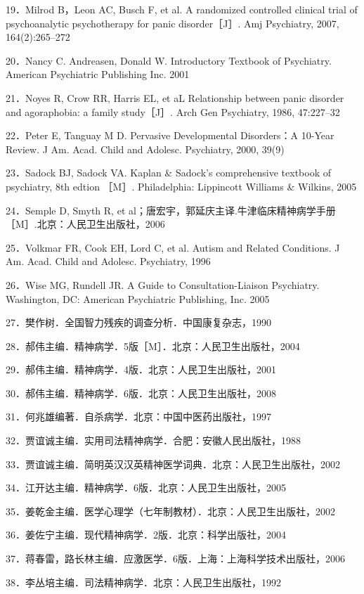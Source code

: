 19．Milrod B，Leon AC, Busch F, et al. A randomized controlled clinical
trial of psychoanalytic psychotherapy for panic disorder［J］. Amj
Psychiatry, 2007, 164(2):265--272

20．Nancy C. Andreasen, Donald W. Introductory Textbook of Psychiatry.
American Psychiatric Publishing Inc. 2001

21．Noyes R, Crow RR, Harris EL, et aL Relationship between panic
disorder and agoraphobia: a family study［J］. Arch Gen Psychiatry,
1986, 47:227--32

22．Peter E, Tanguay M D. Pervasive Developmental Disorders：A 10-Year
Review. J Am. Acad. Child and Adolesc. Psychiatry, 2000, 39(9)

23．Sadock BJ, Sadock VA. Kaplan \& Sadock's comprehensive textbook of
psychiatry, 8th edtion ［M］. Philadelphia: Lippincott Williams \&
Wilkins, 2005

24．Semple D, Smyth R, et
al；唐宏宇，郭延庆主译.牛津临床精神病学手册［M］.北京：人民卫生出版社，2006

25．Volkmar FR, Cook EH, Lord C, et al. Autism and Related Conditions. J
Am. Acad. Child and Adolesc. Psychiatry, 1996

26．Wise MG, Rundell JR. A Guide to Consultation-Liaison Psychiatry.
Washington, DC: American Psychiatric Publishing, Inc. 2005

27．樊作树．全国智力残疾的调查分析．中国康复杂志，1990

28．郝伟主编．精神病学．5版［M］．北京：人民卫生出版社，2004

29．郝伟主编．精神病学．4版．北京：人民卫生出版社，2001

30．郝伟主编．精神病学．6版．北京：人民卫生出版社，2008

31．何兆雄编著．自杀病学．北京：中国中医药出版社，1997

32．贾谊诚主编．实用司法精神病学．合肥：安徽人民出版社，1988

33．贾谊诚主编．简明英汉汉英精神医学词典．北京：人民卫生出版社，2002

34．江开达主编．精神病学．6版．北京：人民卫生出版社，2005

35．姜乾金主编．医学心理学（七年制教材）．北京：人民卫生出版社，2002

36．姜佐宁主编．现代精神病学．2版．北京：科学出版社，2004

37．蒋春雷，路长林主编．应激医学．6版．上海：上海科学技术出版社，2006

38．李丛培主编．司法精神病学．北京：人民卫生出版社，1992

